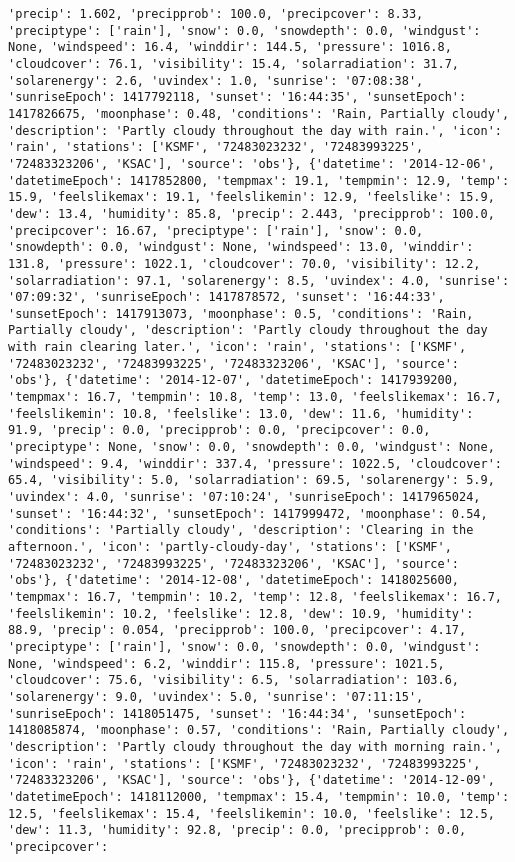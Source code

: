 \documentclass[
  letterpaper,
  DIV=11,
  numbers=noendperiod]{scrartcl}
\begin{document}
\begin{verbatim}
'precip': 1.602, 'precipprob': 100.0, 'precipcover': 8.33, 'preciptype': ['rain'], 'snow': 0.0, 'snowdepth': 0.0, 'windgust': None, 'windspeed': 16.4, 'winddir': 144.5, 'pressure': 1016.8, 'cloudcover': 76.1, 'visibility': 15.4, 'solarradiation': 31.7, 'solarenergy': 2.6, 'uvindex': 1.0, 'sunrise': '07:08:38', 'sunriseEpoch': 1417792118, 'sunset': '16:44:35', 'sunsetEpoch': 1417826675, 'moonphase': 0.48, 'conditions': 'Rain, Partially cloudy', 'description': 'Partly cloudy throughout the day with rain.', 'icon': 'rain', 'stations': ['KSMF', '72483023232', '72483993225', '72483323206', 'KSAC'], 'source': 'obs'}, {'datetime': '2014-12-06', 'datetimeEpoch': 1417852800, 'tempmax': 19.1, 'tempmin': 12.9, 'temp': 15.9, 'feelslikemax': 19.1, 'feelslikemin': 12.9, 'feelslike': 15.9, 'dew': 13.4, 'humidity': 85.8, 'precip': 2.443, 'precipprob': 100.0, 'precipcover': 16.67, 'preciptype': ['rain'], 'snow': 0.0, 'snowdepth': 0.0, 'windgust': None, 'windspeed': 13.0, 'winddir': 131.8, 'pressure': 1022.1, 'cloudcover': 70.0, 'visibility': 12.2, 'solarradiation': 97.1, 'solarenergy': 8.5, 'uvindex': 4.0, 'sunrise': '07:09:32', 'sunriseEpoch': 1417878572, 'sunset': '16:44:33', 'sunsetEpoch': 1417913073, 'moonphase': 0.5, 'conditions': 'Rain, Partially cloudy', 'description': 'Partly cloudy throughout the day with rain clearing later.', 'icon': 'rain', 'stations': ['KSMF', '72483023232', '72483993225', '72483323206', 'KSAC'], 'source': 'obs'}, {'datetime': '2014-12-07', 'datetimeEpoch': 1417939200, 'tempmax': 16.7, 'tempmin': 10.8, 'temp': 13.0, 'feelslikemax': 16.7, 'feelslikemin': 10.8, 'feelslike': 13.0, 'dew': 11.6, 'humidity': 91.9, 'precip': 0.0, 'precipprob': 0.0, 'precipcover': 0.0, 'preciptype': None, 'snow': 0.0, 'snowdepth': 0.0, 'windgust': None, 'windspeed': 9.4, 'winddir': 337.4, 'pressure': 1022.5, 'cloudcover': 65.4, 'visibility': 5.0, 'solarradiation': 69.5, 'solarenergy': 5.9, 'uvindex': 4.0, 'sunrise': '07:10:24', 'sunriseEpoch': 1417965024, 'sunset': '16:44:32', 'sunsetEpoch': 1417999472, 'moonphase': 0.54, 'conditions': 'Partially cloudy', 'description': 'Clearing in the afternoon.', 'icon': 'partly-cloudy-day', 'stations': ['KSMF', '72483023232', '72483993225', '72483323206', 'KSAC'], 'source': 'obs'}, {'datetime': '2014-12-08', 'datetimeEpoch': 1418025600, 'tempmax': 16.7, 'tempmin': 10.2, 'temp': 12.8, 'feelslikemax': 16.7, 'feelslikemin': 10.2, 'feelslike': 12.8, 'dew': 10.9, 'humidity': 88.9, 'precip': 0.054, 'precipprob': 100.0, 'precipcover': 4.17, 'preciptype': ['rain'], 'snow': 0.0, 'snowdepth': 0.0, 'windgust': None, 'windspeed': 6.2, 'winddir': 115.8, 'pressure': 1021.5, 'cloudcover': 75.6, 'visibility': 6.5, 'solarradiation': 103.6, 'solarenergy': 9.0, 'uvindex': 5.0, 'sunrise': '07:11:15', 'sunriseEpoch': 1418051475, 'sunset': '16:44:34', 'sunsetEpoch': 1418085874, 'moonphase': 0.57, 'conditions': 'Rain, Partially cloudy', 'description': 'Partly cloudy throughout the day with morning rain.', 'icon': 'rain', 'stations': ['KSMF', '72483023232', '72483993225', '72483323206', 'KSAC'], 'source': 'obs'}, {'datetime': '2014-12-09', 'datetimeEpoch': 1418112000, 'tempmax': 15.4, 'tempmin': 10.0, 'temp': 12.5, 'feelslikemax': 15.4, 'feelslikemin': 10.0, 'feelslike': 12.5, 'dew': 11.3, 'humidity': 92.8, 'precip': 0.0, 'precipprob': 0.0, 'precipcover': 
\end{verbatim}
\end{document}
